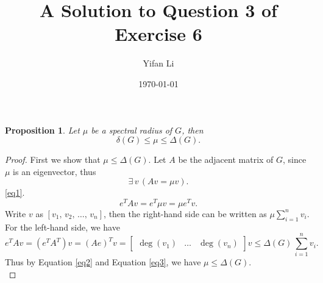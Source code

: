 \documentclass{article}
\title{\vspace{-2cm} A Solution to Question 3 of Exercise 6}
\author{Yifan Li}
\date{\today}
\newtheorem{proposition}{\bf Proposition}
\begin{document}
\maketitle

\begin{proposition}
    Let $\mu$ be a spectral radius of $G$, then
    \begin{equation*}
        \delta(G)\leq\mu\leq\Delta(G).
    \end{equation*}
\end{proposition}

\begin{proof}
    First we show that $\mu\leq\Delta(G)$. Let $A$ be the adjacent matrix of $G$, since $\mu$ is an eigenvector, thus
    \begin{equation}\label{eq1}
        \exists\, v\,(Av=\mu v).
    \end{equation}
     \eqref{eq1}. 
    \begin{equation}\label{eq2}
        e^TAv=e^T\mu v=\mu e^Tv.
    \end{equation}
    Write $v$ as $[v_1,\,v_2,\,\ldots,\,v_n]$, then the right-hand side can be written as $\mu\sum_{i=1}^nv_i$. For the left-hand side, we have
    \begin{equation}\label{eq3}
        e^TAv=(e^TA^T)v=(Ae)^Tv=\begin{bmatrix}
            \deg(v_1) & \ldots & \deg(v_n)
        \end{bmatrix}v\leq\Delta(G)\,\sum_{i=1}^nv_i.
    \end{equation}
    Thus by Equation \eqref{eq2} and Equation \eqref{eq3}, we have $\mu\leq\Delta(G)$.\\


\end{proof}
\end{document}
